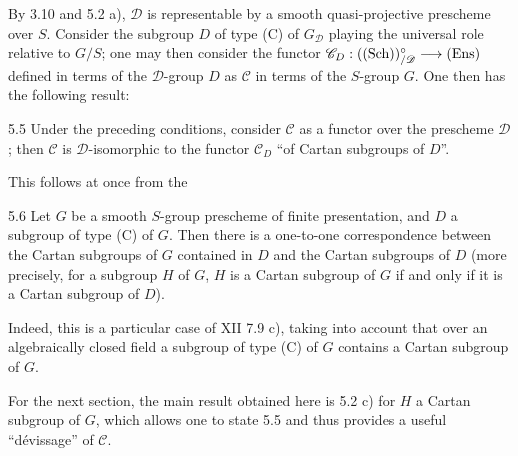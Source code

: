 By 3.10 and 5.2 a), $\mathscr D$ is representable by a smooth
quasi-projective prescheme over $S$. Consider the subgroup $D$ of type
(C) of $G_{\mathscr D}$ playing the universal role relative to $G/S$;
one may then consider the functor
$\mathscr C_D:(\textup{(Sch)})^\circ_{/\mathscr D}\longrightarrow\textup{(Ens)}$ defined in terms of
the $\mathscr D$-group $D$ as $\mathscr C$ in terms of the $S$-group
$G$. One then has the following result:

\begin{proposition}{5.5}\label{XIV.5.5}
Under the preceding conditions, consider $\mathscr C$ as a functor
over the prescheme $\mathscr D$; then $\mathscr C$ is
$\mathscr D$-isomorphic to the functor $\mathscr C_D$ ``of Cartan
subgroups of $D$''.
\end{proposition}
This follows at once from the

\begin{corollary}{5.6}\label{XIV.5.6}
Let $G$ be a smooth $S$-group prescheme of finite presentation,
and $D$ a subgroup of type (C) of $G$. Then there is a one-to-one
correspondence between the Cartan subgroups of $G$ contained in
$D$ and the Cartan subgroups of $D$ (more precisely, for a
subgroup $H$ of $G$, $H$ is a Cartan subgroup of $G$ if and only
if it is a Cartan subgroup of $D$).
\end{corollary}
Indeed, this is a particular case of XII 7.9 c), taking into
account that over an algebraically closed field a subgroup
of type (C) of $G$ contains a Cartan subgroup of $G$.

For the next section, the main result obtained here is 5.2 c)
for $H$ a Cartan subgroup of $G$, which allows one to state
5.5 and thus provides a useful ``d\'evissage'' of $\mathscr C$.

